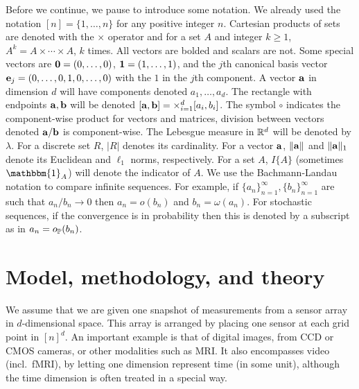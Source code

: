 \documentclass[twoside,11pt]{article}
\begin{document}
Before we continue, we pause to introduce some notation.
We already used the notation $[n] = \{ 1,\ldots,n\}$ for any positive integer $n$.
Cartesian products of sets are denoted with the $\times$ operator and for a set $A$ and integer $k \ge 1$, $A^k = A \times \cdots \times A$, $k$ times.
All vectors are bolded and scalars are not.
Some special vectors are ${\bf 0} = (0,\ldots,0)$, ${\bf 1} = (1, \ldots, 1)$, and the $j$th canonical basis vector $\mathbf{e}_j = (0,\ldots,0,1,0,\ldots,0)$ with the $1$ in the $j$th component.
A vector $\mathbf{a}$ in dimension $d$ will have components denoted $a_1, \dots, a_d$.
The rectangle with endpoints $\mathbf{a}, \mathbf{b}$ will be denoted $[\mathbf{a},\mathbf{b}] = \times_{i=1}^d [a_i,b_i]$.
The symbol $\circ$ indicates the component-wise product for vectors and matrices, division between vectors denoted $\mathbf{a}/\mathbf{b}$ is component-wise.
The Lebesgue measure in $\mathbb{R}^d$ will be denoted by $\lambda$.
For a discrete set $R$, $|R|$ denotes its cardinality.
For a vector $\mathbf{a}$, $\|\mathbf{a}\|$ and $\|\mathbf{a}\|_1$ denote its Euclidean and $\ell_1$ norms, respectively.
For a set $A$, $I\{A\}$ (sometimes $\mathbbm{1}_A$) will denote the indicator of $A$.
%
We use the Bachmann-Landau notation to compare infinite sequences.  
For example, if $\{a_n\}_{n=1}^\infty, \{b_n \}_{n=1}^\infty$ are such that $a_n / b_n \rightarrow 0$ then $a_n = o(b_n)$ and $b_n = \omega(a_n)$.
For stochastic sequences, if the convergence is in probability then this is denoted by a subscript as in $a_n = o_{\mathbb{P}}(b_n)$.
%


\section{Model, methodology, and theory}
\label{sec:main}

We assume that we are given one snapshot of measurements from a sensor array in $d$-dimensional space.  This array is arranged by placing one sensor at each grid point in $[n]^d$.  An important example is that of digital images, from CCD or CMOS cameras, or other modalities such as MRI.  It also encompasses video (incl.~fMRI), by letting one dimension represent time (in some unit), although the time dimension is often treated in a special way.
\end{document}
